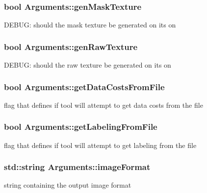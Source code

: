 \subsubsection[{gen\+Mask\+Texture}]{\setlength{\rightskip}{0pt plus 5cm}bool Arguments\+::gen\+Mask\+Texture}\label{struct_arguments_acada25027fb72d5a7d8440b62653af2f}
D\+E\+B\+U\+G\+: should the \textquotesingle{}mask\textquotesingle{} texture be generated on its on \hypertarget{struct_arguments_afe5ecd92c78f3f5a6b751139ec50ee6f}{}
\subsubsection[{gen\+Raw\+Texture}]{\setlength{\rightskip}{0pt plus 5cm}bool Arguments\+::gen\+Raw\+Texture}\label{struct_arguments_afe5ecd92c78f3f5a6b751139ec50ee6f}
D\+E\+B\+U\+G\+: should the \textquotesingle{}raw\textquotesingle{} texture be generated on its on \hypertarget{struct_arguments_a36e514162f0dca494ae8b558016fba23}{}
\subsubsection[{get\+Data\+Costs\+From\+File}]{\setlength{\rightskip}{0pt plus 5cm}bool Arguments\+::get\+Data\+Costs\+From\+File}\label{struct_arguments_a36e514162f0dca494ae8b558016fba23}
flag that defines if tool will attempt to get data costs from the file \hypertarget{struct_arguments_ad2a5a8782138866eacf646d57b7ea531}{}
\subsubsection[{get\+Labeling\+From\+File}]{\setlength{\rightskip}{0pt plus 5cm}bool Arguments\+::get\+Labeling\+From\+File}\label{struct_arguments_ad2a5a8782138866eacf646d57b7ea531}
flag that defines if tool will attempt to get labeling from the file \hypertarget{struct_arguments_af545eb82fb55577ba19adeeb5933e619}{}
\subsubsection[{image\+Format}]{\setlength{\rightskip}{0pt plus 5cm}std\+::string Arguments\+::image\+Format}\label{struct_arguments_af545eb82fb55577ba19adeeb5933e619}
string containing the output image format \hypertarget{struct_arguments_ad753fef0a788c9868deb592ee39e0528}{}
